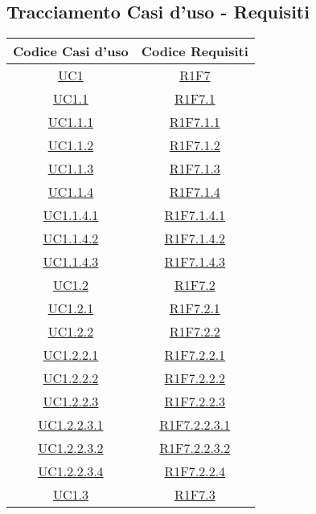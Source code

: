 \subsection{Tracciamento Casi d'uso - Requisiti}
\normalsize
\begin{longtable}{|c|c|}
	\hline
	\textbf{Codice Casi d'uso} & \textbf{Codice Requisiti} \\
	\hline
	\endhead
	\hyperlink{UC1}{UC1} & \hyperlink{R1F7}{R1F7} \\
	\hline
	\hyperlink{UC1.1}{UC1.1} & \hyperlink{R1F7.1}{R1F7.1}\\
	\hline
	\hyperlink{UC1.1.1}{UC1.1.1} & \hyperlink{R1F7.1.1}{R1F7.1.1}\\
	\hline
	\hyperlink{UC1.1.2}{UC1.1.2} & \hyperlink{R1F7.1.2}{R1F7.1.2}\\
	\hline
	\hyperlink{UC1.1.3}{UC1.1.3} & \hyperlink{R1F7.1.3}{R1F7.1.3}\\
	\hline
	\hyperlink{UC1.1.4}{UC1.1.4} & \hyperlink{R1F7.1.4}{R1F7.1.4}\\
	\hline
	\hyperlink{UC1.1.4.1}{UC1.1.4.1} & \hyperlink{R1F7.1.4.1}{R1F7.1.4.1}\\
	\hline
	\hyperlink{UC1.1.4.2}{UC1.1.4.2} & \hyperlink{R1F7.1.4.2}{R1F7.1.4.2}\\
	\hline
	\hyperlink{UC1.1.4.3}{UC1.1.4.3} & \hyperlink{R1F7.1.4.3}{R1F7.1.4.3}\\
	\hline
	\hyperlink{UC1.2}{UC1.2} & \hyperlink{R1F7.2}{R1F7.2}\\
	\hline
	\hyperlink{UC1.2.1}{UC1.2.1} & \hyperlink{R1F7.2.1}{R1F7.2.1}\\
	\hline
	\hyperlink{UC1.2.2}{UC1.2.2} & \hyperlink{R1F7.2.2}{R1F7.2.2}\\
	\hline
	\hyperlink{UC1.2.2.1}{UC1.2.2.1} & \hyperlink{R1F7.2.2.1}{R1F7.2.2.1}\\
	\hline
	\hyperlink{UC1.2.2.2}{UC1.2.2.2} & \hyperlink{R1F7.2.2.2}{R1F7.2.2.2}\\
	\hline
	\hyperlink{UC1.2.2.3}{UC1.2.2.3} & \hyperlink{R1F7.2.2.3}{R1F7.2.2.3}\\
	\hline
	 \hyperlink{UC1.2.2.3.1}{UC1.2.2.3.1} &  \hyperlink{R1F7.2.2.3.1}{R1F7.2.2.3.1}\\
	\hline
	\hyperlink{UC1.2.2.3.2}{UC1.2.2.3.2} & \hyperlink{R1F7.2.2.3.2}{R1F7.2.2.3.2} \\
	\hline
	\hyperlink{UC1.2.2.4}{UC1.2.2.3.4} & \hyperlink{R1F7.2.2.4}{R1F7.2.2.4} \\
	\hline
	\hyperlink{UC1.3}{UC1.3} & \hyperlink{R1F7.3}{R1F7.3} \\

\end{longtable}
